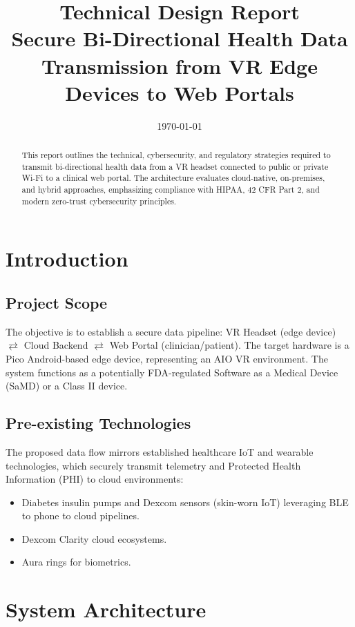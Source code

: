 \documentclass[11pt, letterpaper]{article}
\title{\textbf{Technical Design Report} \\ \Large Secure Bi-Directional Health Data Transmission from VR Edge Devices to Web Portals}
\author{}
\date{\today}
\begin{document}
\maketitle

\begin{abstract}
\noindent This report outlines the technical, cybersecurity, and regulatory strategies required to transmit bi-directional health data from a VR headset connected to public or private Wi-Fi to a clinical web portal. The architecture evaluates cloud-native, on-premises, and hybrid approaches, emphasizing compliance with HIPAA, 42 CFR Part 2, and modern zero-trust cybersecurity principles.
\end{abstract}

\tableofcontents
\newpage

\section{Introduction}

\subsection{Project Scope}
The objective is to establish a secure data pipeline: VR Headset (edge device) $\rightleftarrows$ Cloud Backend $\rightleftarrows$ Web Portal (clinician/patient). The target hardware is a Pico Android-based edge device, representing an AIO VR environment. The system functions as a potentially FDA-regulated Software as a Medical Device (SaMD) or a Class II device.

\subsection{Pre-existing Technologies}
The proposed data flow mirrors established healthcare IoT and wearable technologies, which securely transmit telemetry and Protected Health Information (PHI) to cloud environments:
\begin{itemize}
    \item Diabetes insulin pumps and Dexcom sensors (skin-worn IoT) leveraging BLE to phone to cloud pipelines.
    \item Dexcom Clarity cloud ecosystems.
    \item Aura rings for biometrics.
\end{itemize}

\section{System Architecture}
\end{document}
